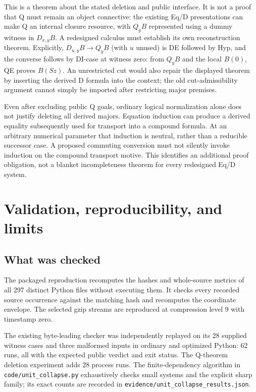 \documentclass[11pt]{article}
\newcommand{\file}[1]{\texttt{\nolinkurl{#1}}}
\begin{document}
This is a theorem about the stated deletion and public interface.
It is not a proof that Q must remain an object connective: the existing
Eq/D presentations can make Q an internal closure resource, with
$Q_yB$ represented using a dummy witness in $D_{x,y}B$. A redesigned
calculus must establish its own reconstruction theorem. Explicitly,
$D_{u,y}B\to Q_yB$ (with $u$ unused) is DE followed by Hyp, and the
converse follows by DI-case at witness zero: from $Q_yB$ and the local
$B(0)$, QE proves $B(Sz)$. An unrestricted cut would also repair the
displayed theorem by inserting the derived D formula into the context;
the old cut-admissibility argument cannot simply be imported after
restricting major premises.

Even after excluding public Q goals, ordinary logical normalization alone
does not justify deleting all derived majors. Equation induction can
produce a derived equality subsequently used for transport into a
compound formula. At an arbitrary numerical parameter that induction is
neutral, rather than a reducible successor case. A proposed commuting
conversion must not silently invoke induction on the compound transport
motive. This identifies an additional proof obligation, not a blanket
incompleteness theorem for every redesigned Eq/D system.

\section{Validation, reproducibility, and limits}

\subsection{What was checked}

The packaged reproduction recomputes the hashes and whole-source metrics
of all 297 distinct Python files without executing them. It checks every
recorded source occurrence against the matching hash and recomputes the
coordinate envelope. The selected gzip streams are reproduced at
compression level 9 with timestamp zero.

The existing byte-leading checker was independently replayed on its 28
supplied witness cases and three malformed inputs in ordinary and
optimized Python: 62 runs, all with the expected public verdict and exit
status. The Q-theorem deletion experiment adds 28 process runs. The
finite-dependency algorithm in \file{code/unit_collapse.py} exhaustively
checks small systems and the explicit sharp family; its exact counts
are recorded in \file{evidence/unit_collapse_results.json}.
\end{document}

